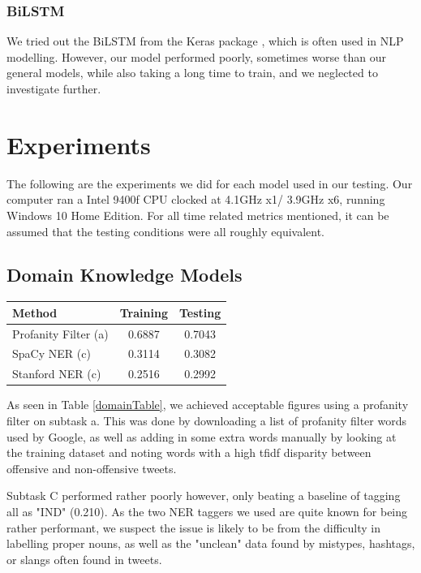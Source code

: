 \documentclass[a4paper, 12pt]{article}
\begin{document}
\begin{multicols}{2}
            \subsubsection{BiLSTM}
                We tried out the BiLSTM from the Keras package \cite{keras}, which is often used in NLP modelling. However, our model performed poorly, sometimes worse than our general models, while also taking a long time to train, and we neglected to investigate further.
    \section{Experiments}
        The following are the experiments we did for each model used in our testing. Our computer ran a Intel 9400f CPU clocked at 4.1GHz x1/ 3.9GHz x6, running Windows 10 Home Edition. For all time related metrics mentioned, it can be assumed that the testing conditions were all roughly equivalent.
    \subsection{Domain Knowledge Models}
        \begin{center}
            \begin{tabular}{l|cc}
                Method & Training & Testing \\
                \hline
                Profanity Filter (a) & 0.6887 & 0.7043 \\
                SpaCy NER (c) & 0.3114 & 0.3082 \\
                Stanford NER (c) & 0.2516 & 0.2992 \\
            \end{tabular}       
            \label{domainTable}
        \end{center}

        As seen in Table \ref{domainTable}, we achieved acceptable figures using a profanity filter on subtask a. This was done by downloading a list of profanity filter words used by Google, as well as adding in some extra words manually by looking at the training dataset and noting words with a high tfidf disparity between offensive and non-offensive tweets. 
        
        Subtask C performed rather poorly however, only beating a baseline of tagging all as "IND" (0.210). As the two NER taggers we used are quite known for being rather performant, we suspect the issue is likely to be from the difficulty in labelling proper nouns, as well as the "unclean" data found by mistypes, hashtags, or slangs often found in tweets.

\end{multicols}
\end{document}
